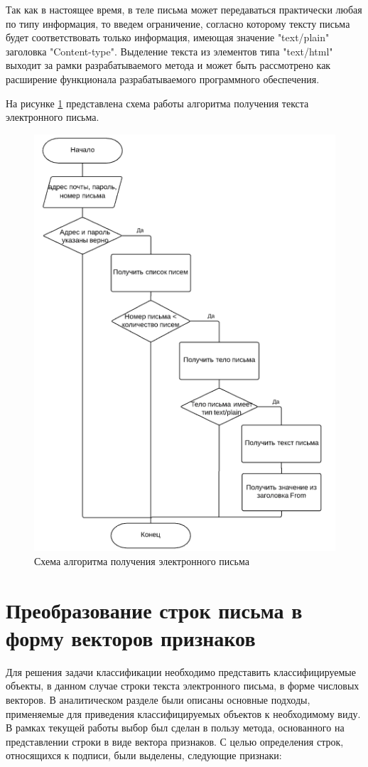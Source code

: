 Так как в настоящее время, в теле письма может передаваться практически любая по типу информация, то введем ограничение, согласно которому тексту письма будет соответствовать только информация, имеющая значение "text/plain" заголовка "Content-type". Выделение текста из элементов типа "text/html" выходит за рамки разрабатываемого метода и может быть рассмотрено как расширение функционала разрабатываемого программного обеспечения.

На рисунке \ref{design:alg-email} представлена схема работы алгоритма получения текста электронного письма.

\newpage
\begin{figure}[h!]
	\centering
	\includegraphics[width=\textwidth]{inc/img/alg-email.png}
	\caption{Схема алгоритма получения электронного письма}
	\label{design:alg-email}
\end{figure}

\section{Преобразование строк письма в форму векторов признаков}
Для решения задачи классификации необходимо представить классифицируемые объекты, в данном случае строки текста электронного письма, в форме числовых векторов. В аналитическом разделе были описаны основные подходы, применяемые для приведения классифицируемых объектов к необходимому виду. В рамках текущей работы выбор был сделан в пользу метода, основанного на представлении строки в виде вектора признаков.
С целью определения строк, относящихся к подписи, были выделены, следующие признаки:

